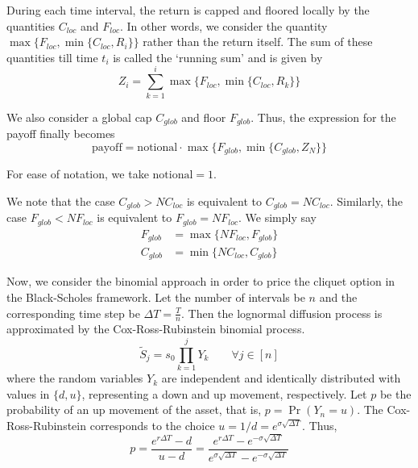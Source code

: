During each time interval, the return is capped and floored locally by the quantities $ C_{loc} $ and $ F_{loc} $. In other words, we consider the quantity $ \max \{ F_{loc}, \min \{ C_{loc}, R_i \} \} $ rather than the return itself. The sum of these quantities till time $t_i$ is called the `running sum' and is given by
\begin{equation}
	\label{eq:sp-clq-rsz}
	Z_i = \sum_{k = 1}^{i} \max \{ F_{loc}, \min \{ C_{loc}, R_k \} \}
\end{equation}

We also consider a global cap $ C_{glob} $ and floor $ F_{glob} $. Thus, the expression for the payoff finally becomes
\begin{equation}
	\label{eq:sp-clq-rsz}
	\mathrm{payoff} = \mathrm{notional} \cdot \max \{ F_{glob}, \min \{ C_{glob}, Z_{N} \} \}
\end{equation}

For ease of notation, we take $ \mathrm{notional} = 1 $.

We note that the case $ C_{glob} > N C_{loc} $ is equivalent to $ C_{glob} = N C_{loc} $. Similarly, the case $ F_{glob} < N F_{loc} $ is equivalent to $ F_{glob} = N F_{loc} $. We simply say
\begin{subequations}
	\label{eq:sp-clq-update-glob}
	\begin{align*}
		F_{glob} &= \max \{ N F_{loc}, F_{glob} \}  \\
		C_{glob} &= \min \{ N C_{loc}, C_{glob} \}
	\end{align*}
\end{subequations}


Now, we consider the binomial approach in order to price the cliquet option in the Black-Scholes framework. Let the number of intervals be $n$ and the corresponding time step be $ \Delta T = \frac{T}{n} $. Then the lognormal diffusion process is approximated by the Cox-Ross-Rubinstein binomial process.
\begin{equation}
	\label{eq:sp-clq-risky-iid-binom-rvs}
	\tilde{S}_j = s_0 \prod_{k = 1}^j Y_k \qquad \forall j \in [n]
\end{equation}
where the random variables $Y_k$ are independent and identically distributed with values in $ \{ d, u \} $, representing a down and up movement, respectively. Let $p$ be the probability of an up movement of the asset, that is, $ p = \Pr( Y_n = u ) $. The Cox-Ross-Rubinstein corresponds to the choice $ u = 1/d = e^{ \sigma \sqrt{ \Delta T } } $. Thus,
\begin{equation}
	\label{eq:sp-clq-pu}
	p = \frac{ e^{r \Delta T} - d }{ u - d } = \frac{ e^{r \Delta T} - e^{ -\sigma \sqrt{ \Delta T } } }{ e^{ \sigma \sqrt{ \Delta T } } - e^{ -\sigma \sqrt{ \Delta T } } }
\end{equation}


